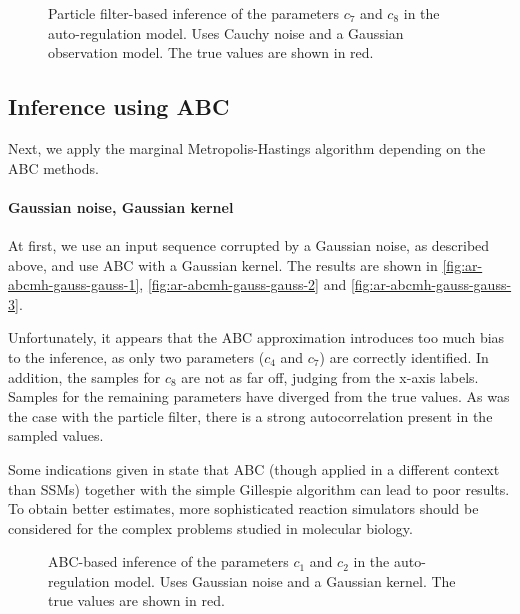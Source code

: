\begin{figure}[htp]%
    \centering
    \qquad
    \caption{Particle filter-based inference of the parameters $c_7$ and $c_8$ in the auto-regulation model. Uses Cauchy noise and a Gaussian observation model. The true values are shown in red.}%
    \label{fig:ar-pmh-cauchy-3}%
\end{figure}


\subsection{Inference using ABC}
Next, we apply the marginal Metropolis-Hastings algorithm depending on the ABC methods.

\paragraph{Gaussian noise, Gaussian kernel}
At first, we use an input sequence corrupted by a Gaussian noise, as described above, and use ABC with a Gaussian kernel. The results are shown in \autoref{fig:ar-abcmh-gauss-gauss-1}, \autoref{fig:ar-abcmh-gauss-gauss-2} and \autoref{fig:ar-abcmh-gauss-gauss-3}.

Unfortunately, it appears that the ABC approximation introduces too much bias to the inference, as only two parameters ($c_4$ and $c_7$) are correctly identified. In addition, the samples for $c_8$ are not as far off, judging from the x-axis labels. Samples for the remaining parameters have diverged from the true values. As was the case with the particle filter, there is a strong autocorrelation present in the sampled values.

Some indications given in \cite{wilkinson-book} state that ABC (though applied in a different context than SSMs) together with the simple Gillespie algorithm can lead to poor results. To obtain better estimates, more sophisticated reaction simulators should be considered for the complex problems studied in molecular biology.

\begin{figure}[htp]%
    \centering
    \qquad
    \caption{ABC-based inference of the parameters $c_1$ and $c_2$ in the auto-regulation model. Uses Gaussian noise and a Gaussian kernel. The true values are shown in red.}%
    \label{fig:ar-abcmh-gauss-gauss-1}%
\end{figure}


